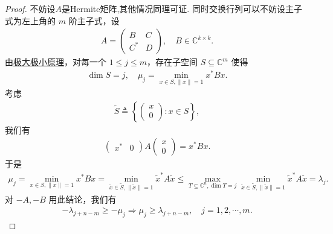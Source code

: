 \documentclass[../../main.tex]{subfiles}%
\begin{document}
\begin{proof}

不妨设$A$是Hermite矩阵,其他情况同理可证.
同时交换行列可以不妨设主子式为左上角的 $m$ 阶主子式，设
\begin{align*}
A = \begin{pmatrix} B & C \\ C^* & D \end{pmatrix}, \quad B\in\mathbb{C}^{k\times k}.
\end{align*}
由\hyperref[theorem:Courant-Fischer的Hermite特征值极大极小原理]{极大极小原理}，对每一个 $1\leqslant j\leqslant m$，存在子空间 $S\subseteq \mathbb{C}^m$ 使得
\begin{align*}
\dim S = j,\quad \mu_j = \min_{x\in S, \|x\|=1} x^*B x.
\end{align*}
考虑
\begin{align*}
\tilde{S} \triangleq \left\{ \begin{pmatrix} x \\ 0 \end{pmatrix} : x\in S \right\},
\end{align*}
我们有
\begin{align*}
\begin{pmatrix} x^* & 0 \end{pmatrix} A \begin{pmatrix} x \\ 0 \end{pmatrix} = x^*B x.
\end{align*}
于是
\begin{align*}
\mu_j = \min_{x\in S, \|x\|=1} x^*B x = \min_{\tilde{x}\in \tilde{S}, \|\tilde{x}\|=1} \tilde{x}^* A \tilde{x} \leqslant \max_{T\subseteq \mathbb{C}^n, \dim T=j} \min_{\tilde{x}\in \tilde{S}, \|\tilde{x}\|=1} \tilde{x}^* A \tilde{x} = \lambda_j.
\end{align*}
对 $-A, -B$ 用此结论，我们有
\begin{align*}
-\lambda_{j+n-m} \geqslant -\mu_j \Longrightarrow \mu_j \geqslant \lambda_{j+n-m}, \quad j=1,2,\cdots,m.
\end{align*}


\end{proof}
\end{document}
